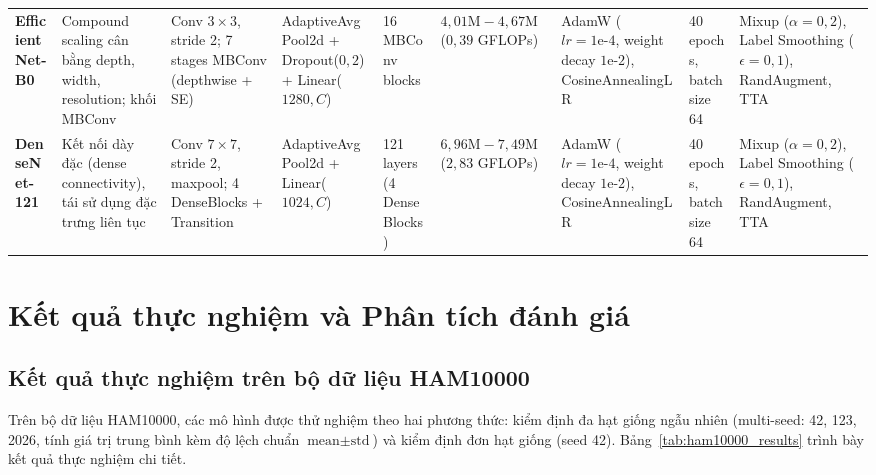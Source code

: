 \begin{table}
{\begin{tabular}{p{2.8cm}p{3.8cm}p{4.2cm}p{3.8cm}p{2.2cm}p{2.5cm}p{3.2cm}p{2.2cm}p{3.8cm}}
\addlinespace
\textbf{EfficientNet-B0} & Compound scaling cân bằng depth, width, resolution; khối MBConv & Conv $3\times3$, stride 2; 7 stages MBConv (depthwise + SE) & AdaptiveAvgPool2d + Dropout($0{,}2$) + Linear($1280, C$) & 16 MBConv blocks & $4{,}01\text{M} - 4{,}67\text{M}$ ($0{,}39$ GFLOPs) & AdamW ($lr=1\text{e-}4$, weight decay $1\text{e-}2$), CosineAnnealingLR & 40 epochs, batch size 64 & Mixup ($\alpha=0{,}2$), Label Smoothing ($\epsilon=0{,}1$), RandAugment, TTA \\
\addlinespace
\textbf{DenseNet-121} & Kết nối dày đặc (dense connectivity), tái sử dụng đặc trưng liên tục & Conv $7\times7$, stride 2, maxpool; 4 DenseBlocks + Transition & AdaptiveAvgPool2d + Linear($1024, C$) & 121 layers (4 DenseBlocks) & $6{,}96\text{M} - 7{,}49\text{M}$ ($2{,}83$ GFLOPs) & AdamW ($lr=1\text{e-}4$, weight decay $1\text{e-}2$), CosineAnnealingLR & 40 epochs, batch size 64 & Mixup ($\alpha=0{,}2$), Label Smoothing ($\epsilon=0{,}1$), RandAugment, TTA \\
\bottomrule
\end{tabular}%
}
\end{table}
\clearpage

\section{Kết quả thực nghiệm và Phân tích đánh giá}

\subsection{Kết quả thực nghiệm trên bộ dữ liệu HAM10000}

Trên bộ dữ liệu HAM10000, các mô hình được thử nghiệm theo hai phương thức: kiểm định đa hạt giống ngẫu nhiên (multi-seed: 42, 123, 2026, tính giá trị trung bình kèm độ lệch chuẩn $\text{mean} \pm \text{std}$) và kiểm định đơn hạt giống (seed 42). Bảng~\ref{tab:ham10000_results} trình bày kết quả thực nghiệm chi tiết.

